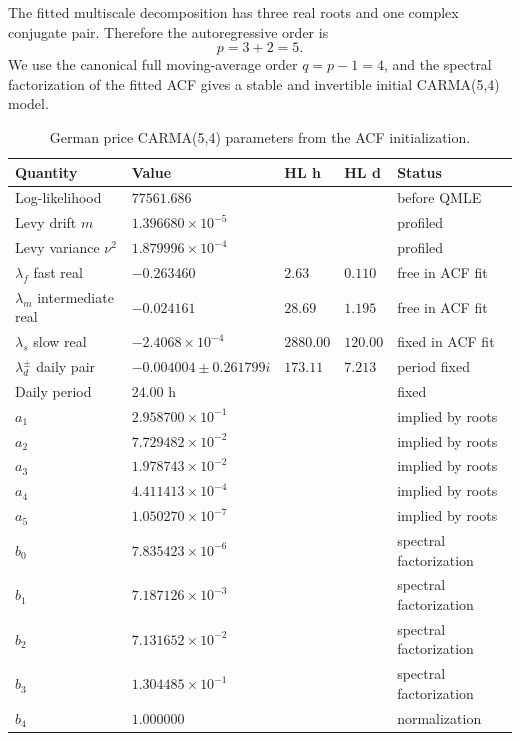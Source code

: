 The fitted multiscale decomposition has three real roots and one complex
conjugate pair. Therefore the autoregressive order is
\[
  p = 3 + 2 = 5 .
\]
We use the canonical full moving-average order \(q=p-1=4\), and the spectral
factorization of the fitted ACF gives a stable and invertible initial
CARMA(5,4) model.

\FloatBarrier

\begin{table}[!htbp]
  \centering
  \caption{German price CARMA(5,4) parameters from the ACF initialization.}
  \label{tab:price-carma-acf-init}
  \begin{tabular}{@{}lllll@{}}
    \toprule
    Quantity & Value & HL h & HL d & Status \\
    \midrule
    Log-likelihood & \(77561.686\) & & & before QMLE \\
    Levy drift \(m\) & \(1.396680{\times}10^{-5}\) & & & profiled \\
    Levy variance \(\nu^2\) & \(1.879996{\times}10^{-4}\) & & & profiled \\
    \midrule
    \(\lambda_f\) fast real & \(-0.263460\) & \(2.63\) & \(0.110\) & free in ACF fit \\
    \(\lambda_m\) intermediate real & \(-0.024161\) & \(28.69\) & \(1.195\) & free in ACF fit \\
    \(\lambda_s\) slow real & \(-2.4068{\times}10^{-4}\) & \(2880.00\) & \(120.00\) & fixed in ACF fit \\
    \(\lambda_d^\pm\) daily pair & \(-0.004004\pm0.261799i\) & \(173.11\) & \(7.213\) & period fixed \\
    Daily period & \(24.00\) h & & & fixed \\
    \midrule
    \(a_1\) & \(2.958700{\times}10^{-1}\) & & & implied by roots \\
    \(a_2\) & \(7.729482{\times}10^{-2}\) & & & implied by roots \\
    \(a_3\) & \(1.978743{\times}10^{-2}\) & & & implied by roots \\
    \(a_4\) & \(4.411413{\times}10^{-4}\) & & & implied by roots \\
    \(a_5\) & \(1.050270{\times}10^{-7}\) & & & implied by roots \\
    \midrule
    \(b_0\) & \(7.835423{\times}10^{-6}\) & & & spectral factorization \\
    \(b_1\) & \(7.187126{\times}10^{-3}\) & & & spectral factorization \\
    \(b_2\) & \(7.131652{\times}10^{-2}\) & & & spectral factorization \\
    \(b_3\) & \(1.304485{\times}10^{-1}\) & & & spectral factorization \\
    \(b_4\) & \(1.000000\) & & & normalization \\
    \bottomrule
  \end{tabular}
\end{table}

